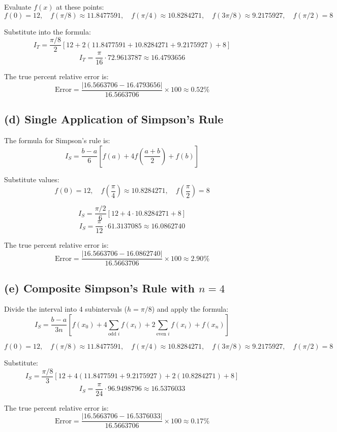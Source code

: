 \documentclass[11pt]{article}
\begin{document}
Evaluate \(f(x)\) at these points:
\[
f(0) = 12, \quad f(\pi/8) \approx 11.8477591, \quad f(\pi/4) \approx 10.8284271, \quad f(3\pi/8) \approx 9.2175927, \quad f(\pi/2) = 8
\]

Substitute into the formula:
\[
I_T = \frac{\pi/8}{2}\left[12 + 2(11.8477591 + 10.8284271 + 9.2175927) + 8\right]
\]
\[
I_T = \frac{\pi}{16} \cdot 72.9613787 \approx 16.4793656
\]

The true percent relative error is:
\[
\text{Error} = \frac{|16.5663706 - 16.4793656|}{16.5663706} \times 100 \approx 0.52\%
\]



\subsection*{(d) Single Application of Simpson's Rule}
The formula for Simpson's rule is:
\[
I_S = \frac{b - a}{6}\left[f(a) + 4f\left(\frac{a+b}{2}\right) + f(b)\right]
\]

Substitute values:
\[
f(0) = 12, \quad f\left(\frac{\pi}{4}\right) \approx 10.8284271, \quad f\left(\frac{\pi}{2}\right) = 8
\]

\[
I_S = \frac{\pi/2}{6}\left[12 + 4 \cdot 10.8284271 + 8\right]
\]
\[
I_S = \frac{\pi}{12}\cdot 61.3137085 \approx 16.0862740
\]

The true percent relative error is:
\[
\text{Error} = \frac{|16.5663706 - 16.0862740|}{16.5663706} \times 100 \approx 2.90\%
\]



\subsection*{(e) Composite Simpson's Rule with \(n = 4\)}
Divide the interval into 4 subintervals (\(h = \pi/8\)) and apply the formula:
\[
I_S = \frac{b - a}{3n}\left[f(x_0) + 4\sum_{\text{odd } i} f(x_i) + 2\sum_{\text{even } i} f(x_i) + f(x_n)\right]
\]

\[
f(0) = 12, \quad f(\pi/8) \approx 11.8477591, \quad f(\pi/4) \approx 10.8284271, \quad f(3\pi/8) \approx 9.2175927, \quad f(\pi/2) = 8
\]

Substitute:
\[
I_S = \frac{\pi/8}{3}\left[12 + 4(11.8477591 + 9.2175927) + 2(10.8284271) + 8\right]
\]
\[
I_S = \frac{\pi}{24}\cdot 96.9498796 \approx 16.5376033
\]

The true percent relative error is:
\[
\text{Error} = \frac{|16.5663706 - 16.5376033|}{16.5663706} \times 100 \approx 0.17\%
\]
\end{document}
